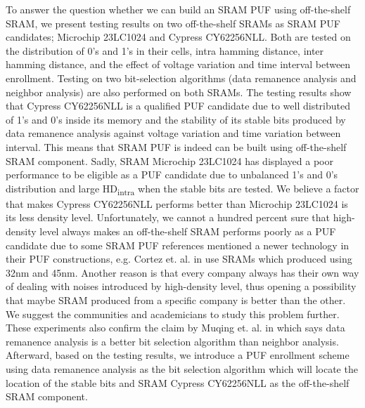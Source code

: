 To answer the question whether we can build an SRAM PUF using off-the-shelf SRAM, we present testing results on two off-the-shelf SRAMs as SRAM PUF candidates; Microchip 23LC1024 and Cypress CY62256NLL. Both are tested on the distribution of 0's and 1's in their cells, intra hamming distance, inter hamming distance, and the effect of voltage variation and time interval between enrollment. Testing on two bit-selection algorithms (data remanence analysis and neighbor analysis) are also performed on both SRAMs. The testing results show that Cypress CY62256NLL is a qualified PUF candidate due to well distributed of 1's and 0's inside its memory and the stability of its stable bits produced by data remanence analysis against voltage variation and time variation between interval. This means that SRAM PUF is indeed can be built using off-the-shelf SRAM component.
Sadly, SRAM Microchip 23LC1024 has displayed a poor performance to be eligible as a PUF candidate due to unbalanced 1's and 0's distribution and large HD\textsubscript{intra} when the stable bits are tested. We believe a factor that makes Cypress CY62256NLL performs better than Microchip 23LC1024 is its less density level. Unfortunately, we cannot a hundred percent sure that high-density level always makes an off-the-shelf SRAM performs poorly as a PUF candidate due to some SRAM PUF references mentioned a newer technology in their PUF constructions, e.g. Cortez et. al. in \cite{7102498} use SRAMs which produced using 32nm and 45nm. Another reason is that every company always has their own way of dealing with noises introduced by high-density level, thus opening a possibility that maybe SRAM produced from a specific company is better than the other. We suggest the communities and academicians to study this problem further.
These experiments also confirm the claim by Muqing et. al. in \cite{liu_zhou_tang_parhi_kim_2017} which says data remanence analysis is a better bit selection algorithm than neighbor analysis.
Afterward, based on the testing results, we introduce a PUF enrollment scheme using data remanence analysis as the bit selection algorithm which will locate the location of the stable bits and SRAM Cypress CY62256NLL as the off-the-shelf SRAM component.



